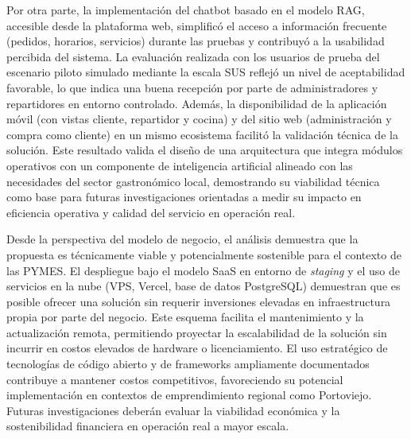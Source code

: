 Por otra parte, la implementación del chatbot basado en el modelo RAG, accesible desde la plataforma web, simplificó el acceso a información frecuente (pedidos, horarios, servicios) durante las pruebas y contribuyó a la usabilidad percibida del sistema. La evaluación realizada con los usuarios de prueba del escenario piloto simulado mediante la escala SUS reflejó un nivel de aceptabilidad favorable, lo que indica una buena recepción por parte de administradores y repartidores en entorno controlado. Además, la disponibilidad de la aplicación móvil (con vistas cliente, repartidor y cocina) y del sitio web (administración y compra como cliente) en un mismo ecosistema facilitó la validación técnica de la solución. Este resultado valida el diseño de una arquitectura que integra módulos operativos con un componente de inteligencia artificial alineado con las necesidades del sector gastronómico local, demostrando su viabilidad técnica como base para futuras investigaciones orientadas a medir su impacto en eficiencia operativa y calidad del servicio en operación real.

Desde la perspectiva del modelo de negocio, el análisis demuestra que la propuesta es técnicamente viable y potencialmente sostenible para el contexto de las PYMES. El despliegue bajo el modelo SaaS en entorno de \textit{staging} y el uso de servicios en la nube (VPS, Vercel, base de datos PostgreSQL) demuestran que es posible ofrecer una solución sin requerir inversiones elevadas en infraestructura propia por parte del negocio. Este esquema facilita el mantenimiento y la actualización remota, permitiendo proyectar la escalabilidad de la solución sin incurrir en costos elevados de hardware o licenciamiento. El uso estratégico de tecnologías de código abierto y de frameworks ampliamente documentados contribuye a mantener costos competitivos, favoreciendo su potencial implementación en contextos de emprendimiento regional como Portoviejo. Futuras investigaciones deberán evaluar la viabilidad económica y la sostenibilidad financiera en operación real a mayor escala.

